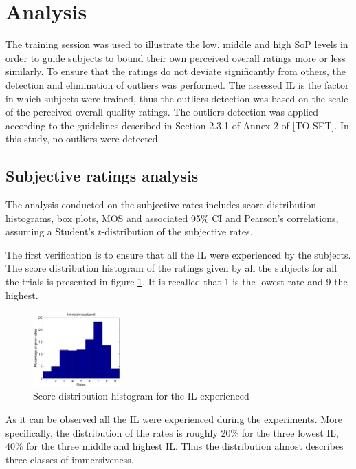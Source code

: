 \section{Analysis}
The training session was used to illustrate the low, middle and high \ac{SoP} levels in order to guide subjects to bound their own perceived overall ratings more or less similarly.
To ensure that the ratings do not deviate significantly from others, the detection and elimination of outliers was performed.
The assessed \ac{IL} is the factor in which subjects were trained, thus the outliers detection was based on the scale of the perceived overall quality ratings. The outliers detection was applied according to the guidelines described in Section 2.3.1 of Annex 2 of [TO SET]. In this study, no outliers were detected.

\subsection{Subjective ratings analysis}

The analysis conducted on the subjective rates includes score distribution histograms, box plots, \acf{MOS} and associated 95\% \acf{CI} and Pearson's correlations, assuming a Student's $t$-distribution of the subjective rates. 

The first verification is to ensure that all the \acf{IL} were experienced by the subjects. The score distribution histogram of the ratings given by all the subjects for all the trials is presented in figure \ref{Hist}. It is recalled that 1 is the lowest rate and 9 the highest.

\begin{figure}[!ht]
    \center
    \includegraphics[width=0.3\textwidth]{./images/Hist9ImmersivnessLevel.png}
    \caption{Score distribution histogram for the \ac{IL} experienced }
    \label{Hist}
\end{figure}

As it can be observed all the \ac{IL} were experienced during the experiments. More specifically, the distribution of the rates is roughly 20\% for the three lowest \ac{IL}, 40\% for the three middle and highest \ac{IL}. Thus the distribution almost describes three classes of immersiveness.  

